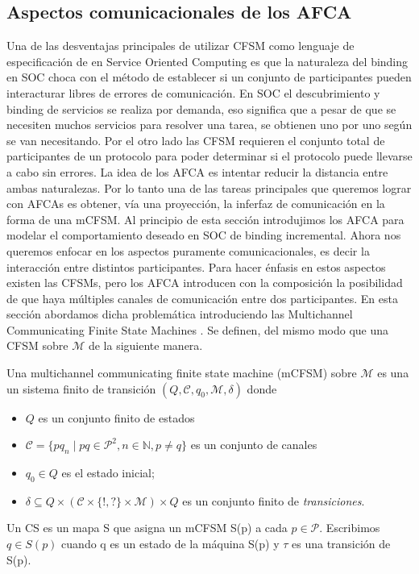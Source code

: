 \subsection{Aspectos comunicacionales de los AFCA}

Una de las desventajas principales de utilizar CFSM como lenguaje de especificación de en Service Oriented Computing es que la naturaleza del binding en SOC choca con el método de establecer si un conjunto de participantes pueden interacturar libres de errores de comunicación. En SOC el descubrimiento y binding de servicios se realiza por demanda, eso significa que a pesar de que se necesiten muchos servicios para resolver una tarea, se obtienen uno por uno según se van necesitando. Por el otro lado las CFSM requieren el conjunto total de participantes de un protocolo para poder determinar si el protocolo puede llevarse a cabo sin errores. La idea de los AFCA es intentar reducir la distancia entre ambas naturalezas. Por lo tanto una de las tareas principales que queremos lograr con AFCAs es obtener, vía una proyección, la inferfaz de comunicación en la forma de una mCFSM.
Al principio de esta sección introdujimos los AFCA para modelar el comportamiento deseado en SOC de binding incremental. Ahora nos queremos enfocar en los aspectos puramente comunicacionales, es decir la interacción entre distintos participantes. Para hacer énfasis en estos aspectos existen las CFSMs, pero los AFCA introducen con la composición la posibilidad de que haya múltiples canales de comunicación entre dos participantes. En esta sección abordamos dicha problemática introduciendo las Multichannel Communicating Finite State Machines \cite[Def.~82]{vissani:phdthesis}. Se definen, del mismo modo que una CFSM sobre $\mathcal{M}$ de la siguiente manera.

\begin{definition} Una multichannel communicating finite state machine (mCFSM) sobre $\mathcal{M}$ es una un sistema finito de transición $(Q, \mathcal{C}, q_0, \mathcal{M}, \delta)$ donde
\begin{itemize}
  \item $Q$ es un conjunto finito de estados
  \item $\mathcal{C} = \{ pq_n \mid pq \in \mathcal{P}^2, n \in \mathbb{N}, p \not= q\}$ es un conjunto de canales
  \item $q_0 \in Q$ es el estado inicial;
  \item $\delta \subseteq Q \times (\mathcal{C} \times \{!,?\} \times \mathcal{M}) \times
    Q$ es un conjunto finito de \emph{transiciones}.
  \end{itemize}

Un CS es un mapa S que asigna un mCFSM S(p) a cada $p \in \mathcal{P}$. Escribimos $q \in S(p)$ cuando q es un estado de la máquina S(p) y $\tau$ es una transición de S(p).\end{definition}

